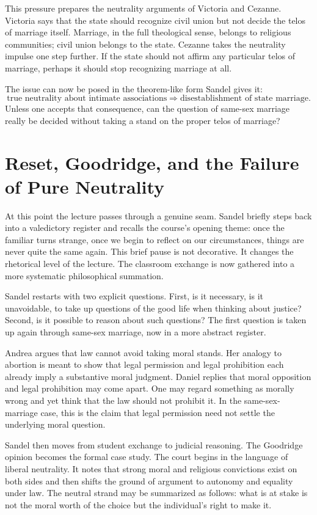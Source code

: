 This pressure prepares the neutrality arguments of Victoria and Cezanne. Victoria says that the state should recognize civil union but not decide the telos of marriage itself. Marriage, in the full theological sense, belongs to religious communities; civil union belongs to the state. Cezanne takes the neutrality impulse one step further. If the state should not affirm any particular telos of marriage, perhaps it should stop recognizing marriage at all.

The issue can now be posed in the theorem-like form Sandel gives it:
\begin{equation}
\text{true neutrality about intimate associations}
\Longrightarrow
\text{disestablishment of state marriage}.
\end{equation}
Unless one accepts that consequence, can the question of same-sex marriage really be decided without taking a stand on the proper telos of marriage?

\section{Reset, Goodridge, and the Failure of Pure Neutrality}

At this point the lecture passes through a genuine seam. Sandel briefly steps back into a valedictory register and recalls the course's opening theme: once the familiar turns strange, once we begin to reflect on our circumstances, things are never quite the same again. This brief pause is not decorative. It changes the rhetorical level of the lecture. The classroom exchange is now gathered into a more systematic philosophical summation.

Sandel restarts with two explicit questions. First, is it necessary, is it unavoidable, to take up questions of the good life when thinking about justice? Second, is it possible to reason about such questions? The first question is taken up again through same-sex marriage, now in a more abstract register.

Andrea argues that law cannot avoid taking moral stands. Her analogy to abortion is meant to show that legal permission and legal prohibition each already imply a substantive moral judgment. Daniel replies that moral opposition and legal prohibition may come apart. One may regard something as morally wrong and yet think that the law should not prohibit it. In the same-sex-marriage case, this is the claim that legal permission need not settle the underlying moral question.

Sandel then moves from student exchange to judicial reasoning. The Goodridge opinion becomes the formal case study. The court begins in the language of liberal neutrality. It notes that strong moral and religious convictions exist on both sides and then shifts the ground of argument to autonomy and equality under law. The neutral strand may be summarized as follows: what is at stake is not the moral worth of the choice but the individual's right to make it.

